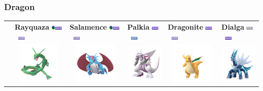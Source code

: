 \documentclass[8pt,aspectratio=169,compress]{beamer}
\newcommand{\flyingfull}{\includegraphics[height=0.15cm]{../../images/type/full/Flying.png}}
\newcommand{\dragonfull}{\includegraphics[height=0.15cm]{../../images/type/full/Dragon.png}}
\newcommand{\waterfull}{\includegraphics[height=0.15cm]{../../images/type/full/Water.png}}
\newcommand{\steelfull}{\includegraphics[height=0.15cm]{../../images/type/full/Steel.png}}
\newcommand{\megaevol}{\includegraphics[width=0.2cm]{../../images/megaevolve}}
\begin{document}
\begin{frame}
\begin{tiny}
\frametitle{Dragon}

\begin{block}{}
\begin{center}
\begin{tabular}{rp{2cm}p{2cm}p{2cm}p{2cm}p{2cm}} 
    & \textbf{{Rayquaza}} \megaevol \hfill  \dragonfull~\flyingfull&  \textbf{{Salamence}} \megaevol \hfill \dragonfull~\flyingfull &  \textbf{{Palkia}} \hfill \dragonfull~\waterfull &  \textbf{Dragonite} \hfill \dragonfull~\flyingfull &   \textbf{Dialga} \hfill \steelfull~\dragonfull \\ 
    &  \multicolumn{1}{c}{\includegraphics[width=2cm]{../../images/pokemon/rayquaza.png}} &   \multicolumn{1}{c}{\includegraphics[width=2cm]{../../images/pokemon/salamence.png} } &   \multicolumn{1}{c}{\includegraphics[width=2cm]{../../images/pokemon/palkia.png} } & \multicolumn{1}{c}{\includegraphics[width=2cm]{../../images/pokemon/dragonite.png} } & \multicolumn{1}{c}{\includegraphics[width=2cm]{../../images/pokemon/dialga.png} }    \\ \hline

\end{tabular}
\end{center}
\end{block}
\end{tiny}
\end{frame}
\end{document}
